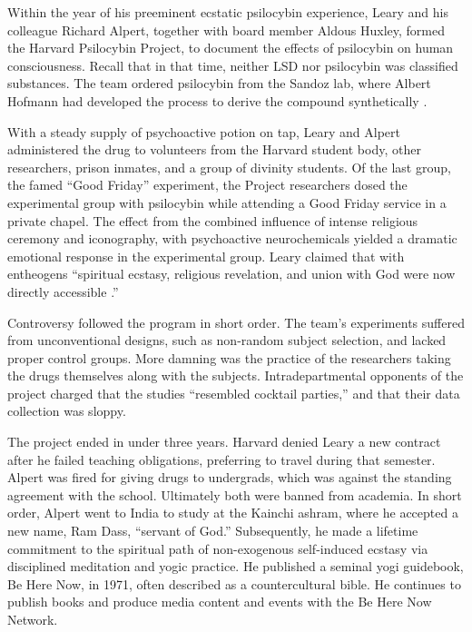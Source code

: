 \documentclass{UIdahoMastersThesis}
\begin{document}
Within the year of his preeminent ecstatic psilocybin experience, Leary and his colleague Richard Alpert, together with board member Aldous Huxley, formed the Harvard Psilocybin Project, to document the effects of psilocybin on human consciousness. Recall that in that time, neither LSD nor psilocybin was classified substances. The team ordered psilocybin from the Sandoz lab, where Albert Hofmann had developed the process to derive the compound synthetically \cite{melechi_psychedelia_1997}.

With a steady supply of psychoactive potion on tap, Leary and Alpert administered the drug to volunteers from the Harvard student body, other researchers, prison inmates, and a group of divinity students. Of the last group, the famed ``Good Friday'' experiment, the Project researchers dosed the experimental group with psilocybin while attending a Good Friday service in a private chapel. The effect from the combined influence of intense religious ceremony and iconography, with psychoactive neurochemicals yielded a dramatic emotional response in the experimental group. Leary claimed that with entheogens \enquote{spiritual ecstasy, religious revelation, and union with God were now directly accessible \cite{mansnerus_timothy_1996}.}

Controversy followed the program in short order. The team's experiments suffered from unconventional designs, such as non-random subject selection, and lacked proper control groups. More damning was the practice of the researchers taking the drugs themselves along with the subjects. Intradepartmental opponents of the project charged that the studies ``resembled cocktail parties,'' and that their data collection was sloppy.

The project ended in under three years. Harvard denied Leary a new contract after he failed teaching obligations, preferring to travel during that semester. Alpert was fired for giving drugs to undergrads, which was against the standing agreement with the school. Ultimately both were banned from academia. In short order, Alpert went to India to study at the Kainchi ashram, where he accepted a new name, Ram Dass, ``servant of God.'' Subsequently, he made a lifetime commitment to the spiritual path of non-exogenous self-induced ecstasy via disciplined meditation and yogic practice. He published a seminal yogi guidebook, Be Here Now, in 1971, often described as a countercultural bible. He continues to publish books and produce media content and events with the Be Here Now Network.
\end{document}
